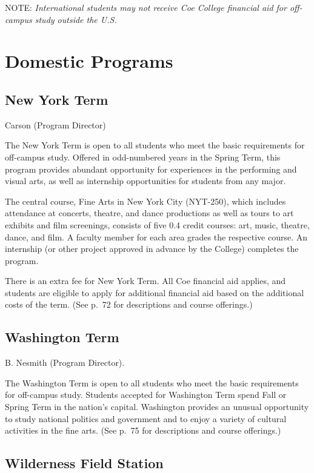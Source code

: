 \documentclass[
  letterpaper,
]{scrbook}
\begin{document}
NOTE: \emph{International students may not receive Coe College financial
aid for off-campus study outside the U.S.}

\section{Domestic Programs}\label{domestic-programs}

\subsection{New York Term}\label{new-york-term}

Carson (Program Director)

The New York Term is open to all students who meet the basic
requirements for off-campus study. Offered in odd-numbered years in the
Spring Term, this program provides abundant opportunity for experiences
in the performing and visual arts, as well as internship opportunities
for students from any major.

The central course, Fine Arts in New York City (NYT-250), which includes
attendance at concerts, theatre, and dance productions as well as tours
to art exhibits and film screenings, consists of five 0.4 credit
courses: art, music, theatre, dance, and film. A faculty member for each
area grades the respective course. An internship (or other project
approved in advance by the College) completes the program.

There is an extra fee for New York Term. All Coe financial aid applies,
and students are eligible to apply for additional financial aid based on
the additional costs of the term. (See p.~72 for descriptions and course
offerings.)

\subsection{Washington Term}\label{washington-term}

B. Nesmith (Program Director).

The Washington Term is open to all students who meet the basic
requirements for off-campus study. Students accepted for Washington Term
spend Fall or Spring Term in the nation's capital. Washington provides
an unusual opportunity to study national politics and government and to
enjoy a variety of cultural activities in the fine arts. (See p.~75 for
descriptions and course offerings.)

\subsection{Wilderness Field Station}\label{wilderness-field-station}
\end{document}
